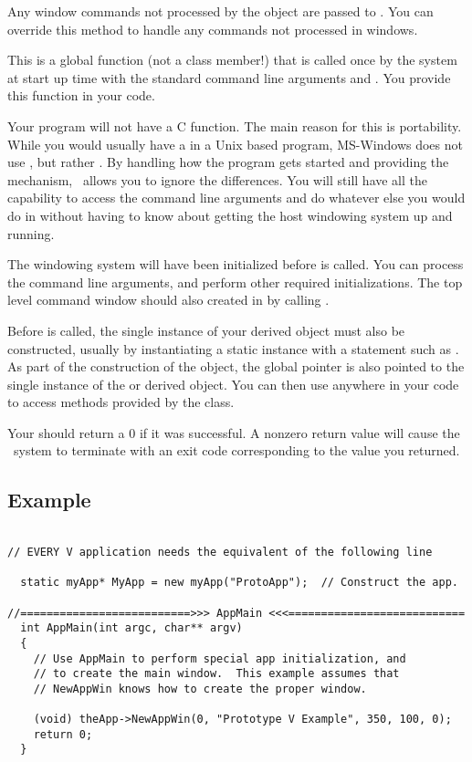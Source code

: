 Any window commands not processed by the  object
are passed to . You can override this method
to handle any commands not processed in windows.


This is a global function (not a class member!) that is called
once by the system at start up time with the standard command
line arguments  and . You provide this
function in your code.

Your program will not have a C  function. The main
reason for this is portability. While you would usually have
a  in a Unix based program, MS-Windows does not
use , but rather . By handling
how the program gets started and providing the 
mechanism, \V\ allows you to ignore the differences. You will
still have all the capability to access the command line arguments
and do whatever else you would do in  without having
to know about getting the host windowing system up and running.

The windowing system will have been initialized before 
is called. You can process the command line arguments, and
perform other required initializations. The top level command
window should also created in  by calling .

Before  is called, the single instance of your
derived  object must also be constructed, usually by
instantiating a static instance with a statement such as . As part of the
construction of the  object, the global pointer
 is also pointed to the single instance of the
 or derived  object. You can then use
 anywhere in your code to access methods provided by
the  class.

Your  should return a 0 if it was successful. A
nonzero return value will cause the \V\ system to terminate with
an exit code corresponding to the value you returned.

\subsection* {Example}

\footnotesize
\begin{verbatim}

// EVERY V application needs the equivalent of the following line

  static myApp* MyApp = new myApp("ProtoApp");  // Construct the app.

//==========================>>> AppMain <<<===========================
  int AppMain(int argc, char** argv)
  {
    // Use AppMain to perform special app initialization, and
    // to create the main window.  This example assumes that
    // NewAppWin knows how to create the proper window.

    (void) theApp->NewAppWin(0, "Prototype V Example", 350, 100, 0);
    return 0;
  }
\end{verbatim}

